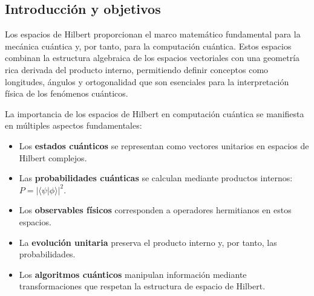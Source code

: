 \portada

\begin{esquemaExplorador}
\end{esquemaExplorador}


\subsection{Introducción y objetivos}

Los espacios de Hilbert proporcionan el marco matemático fundamental para la mecánica cuántica y, por tanto, para la computación cuántica. Estos espacios combinan la estructura algebraica de los espacios vectoriales con una geometría rica derivada del producto interno, permitiendo definir conceptos como longitudes, ángulos y ortogonalidad que son esenciales para la interpretación física de los fenómenos cuánticos.

La importancia de los espacios de Hilbert en computación cuántica se manifiesta en múltiples aspectos fundamentales:

\begin{itemize}
  \item Los \textbf{estados cuánticos} se representan como vectores unitarios en espacios de Hilbert complejos.
  \item Las \textbf{probabilidades cuánticas} se calculan mediante productos internos: $P = |\langle\psi|\phi\rangle|^2$.
  \item Los \textbf{observables físicos} corresponden a operadores hermitianos en estos espacios.
  \item La \textbf{evolución unitaria} preserva el producto interno y, por tanto, las probabilidades.
  \item Los \textbf{algoritmos cuánticos} manipulan información mediante transformaciones que respetan la estructura de espacio de Hilbert.
\end{itemize}

